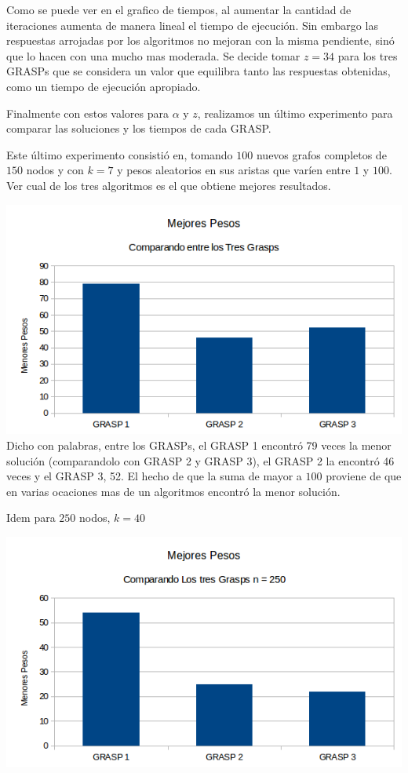 Como se puede ver en el grafico de tiempos, al aumentar la cantidad de iteraciones aumenta de manera lineal el tiempo de ejecución. Sin embargo las respuestas arrojadas por los algoritmos no mejoran con la misma pendiente, sinó que lo hacen con una mucho mas moderada. Se decide tomar $z = 34$ para los tres GRASPs que se considera un valor que equilibra tanto las respuestas obtenidas, como un tiempo de ejecución apropiado. 

Finalmente con estos valores para $\alpha$ y $z$, realizamos un último experimento para comparar las soluciones y los tiempos de cada GRASP.

Este último experimento consistió en, tomando $100$ nuevos grafos completos de $150$ nodos y con $k = 7$ y pesos aleatorios en sus aristas que varíen entre $1$ y $100$. Ver cual de los tres algoritmos es el que obtiene mejores resultados.

\includegraphics[scale=0.7]{Ej5/CompetenciaGRASPs1.png}\\

Dicho con palabras, entre los GRASPs, el GRASP 1 encontró 79 veces la menor solución (comparandolo con GRASP 2 y GRASP 3), el GRASP 2 la encontró 46 veces y el GRASP 3, 52. El hecho de que la suma de mayor a $100$ proviene de que en varias ocaciones mas de un algoritmos encontró la menor solución.

Idem para $250$ nodos, $k = 40$

\includegraphics[scale=0.7]{Ej5/CompetenciaGRASPs2.png}\\

